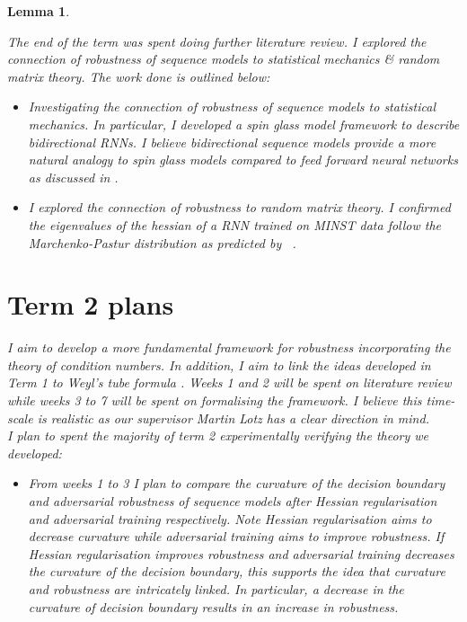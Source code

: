 \documentclass[a4paper,singlecolumn,12pt]{article}
\newtheorem{lemma}{Lemma}[subsection]
\begin{document}
\begin{lemma}
\begin{itemize}
\end{itemize}
The end of the term was spent doing further literature review. I explored the connection of robustness of sequence models to statistical mechanics \& random matrix theory. The work done is outlined below:

\begin{itemize}

    \item Investigating the connection of robustness of sequence models to statistical mechanics. In particular, I developed a spin glass model framework to describe bidirectional RNNs. I believe bidirectional sequence models provide a more natural analogy to spin glass models compared to feed forward neural networks as discussed in \cite{agliari2014walk, choromanska2015loss}. 
    
    \item I explored the connection of robustness to random matrix theory. I confirmed the eigenvalues of the hessian of a RNN trained on MINST data follow the Marchenko-Pastur distribution as predicted by ~\cite{NIPS2017_0f3d014e}.
\end{itemize}

\section{Term 2 plans}

I aim to develop a more fundamental framework for robustness incorporating the theory of condition numbers. In addition, I aim to link the ideas developed in Term 1 to Weyl's tube formula \cite{lotz2013volume}. Weeks 1 and 2 will be spent on literature review while weeks 3 to 7 will be spent on formalising the framework. I believe this time-scale is realistic as our supervisor Martin Lotz has a clear direction in mind.\\


\noindent I plan to spent the majority of term 2 experimentally verifying the theory we developed: 
\begin{itemize}

\item From weeks 1 to 3 I plan to compare the curvature of the decision boundary and adversarial robustness of sequence models after Hessian regularisation and adversarial training respectively. Note Hessian regularisation aims to decrease curvature while adversarial training aims to improve robustness. If Hessian regularisation improves robustness and adversarial training decreases the curvature of the decision boundary, this supports the idea that curvature and robustness are intricately linked. In particular, a decrease in the curvature of decision boundary results in an increase in robustness.


\end{itemize}
\end{lemma}
\end{document}
